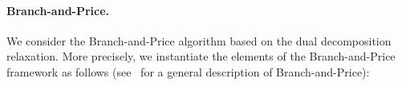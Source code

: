 \documentclass{article}
\newcommand{\e}{\varepsilon}
\newcommand{\red}[1]{{\color{red} #1}}
\newcommand{\xv}[0]{\mathbf{x}}
\newcommand{\yv}[0]{\mathbf{y}}
\newcommand{\bv}[0]{\mathbf{b}}
\newcommand{\LAG}{\textup{DUAL}}
\begin{document}


\paragraph{Branch-and-Price.} We consider the Branch-and-Price algorithm based on the dual decomposition relaxation. More precisely, we instantiate the elements of the Branch-and-Price framework as follows (see~\cite{lubbecke2010column,desaulniers2006column} for a general description of Branch-and-Price): %
\end{document}
